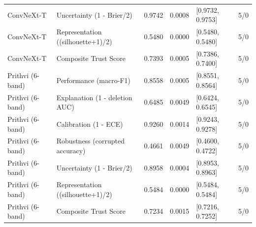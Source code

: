 \begin{longtable}{llrrlr}
ConvNeXt-T & Uncertainty (1 - Brier/2) & 0.9742 & 0.0008 & [0.9732, 0.9753] & 5/0 \\
ConvNeXt-T & Representation ((silhouette+1)/2) & 0.5480 & 0.0000 & [0.5480, 0.5480] & 5/0 \\
ConvNeXt-T & Composite Trust Score & 0.7393 & 0.0005 & [0.7386, 0.7400] & 5/0 \\
Prithvi (6-band) & Performance (macro-F1) & 0.8558 & 0.0005 & [0.8551, 0.8564] & 5/0 \\
Prithvi (6-band) & Explanation (1 - deletion AUC) & 0.6485 & 0.0049 & [0.6424, 0.6545] & 5/0 \\
Prithvi (6-band) & Calibration (1 - ECE) & 0.9260 & 0.0014 & [0.9243, 0.9278] & 5/0 \\
Prithvi (6-band) & Robustness (corrupted accuracy) & 0.4661 & 0.0049 & [0.4600, 0.4722] & 5/0 \\
Prithvi (6-band) & Uncertainty (1 - Brier/2) & 0.8958 & 0.0004 & [0.8953, 0.8963] & 5/0 \\
Prithvi (6-band) & Representation ((silhouette+1)/2) & 0.5484 & 0.0000 & [0.5484, 0.5484] & 5/0 \\
Prithvi (6-band) & Composite Trust Score & 0.7234 & 0.0015 & [0.7216, 0.7252] & 5/0 \\
\bottomrule
\end{longtable}
